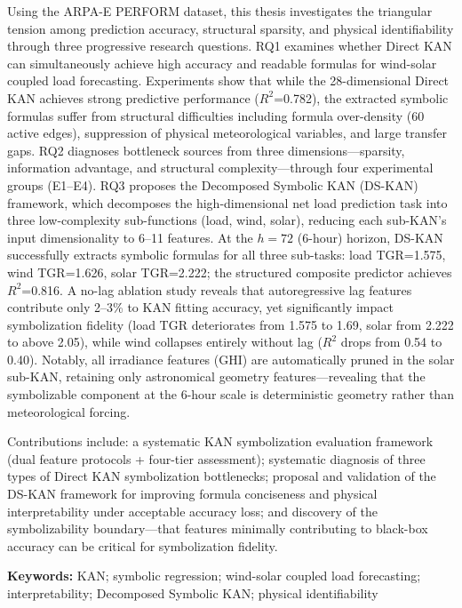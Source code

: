 \documentclass[12pt,a4paper,oneside]{ctexbook}
\begin{document}
Using the ARPA-E PERFORM dataset, this thesis investigates the triangular tension among prediction accuracy, structural sparsity, and physical identifiability through three progressive research questions. RQ1 examines whether Direct KAN can simultaneously achieve high accuracy and readable formulas for wind-solar coupled load forecasting. Experiments show that while the 28-dimensional Direct KAN achieves strong predictive performance ($R^2$=0.782), the extracted symbolic formulas suffer from structural difficulties including formula over-density (60 active edges), suppression of physical meteorological variables, and large transfer gaps. RQ2 diagnoses bottleneck sources from three dimensions---sparsity, information advantage, and structural complexity---through four experimental groups (E1--E4). RQ3 proposes the Decomposed Symbolic KAN (DS-KAN) framework, which decomposes the high-dimensional net load prediction task into three low-complexity sub-functions (load, wind, solar), reducing each sub-KAN's input dimensionality to 6--11 features. At the $h=72$ (6-hour) horizon, DS-KAN successfully extracts symbolic formulas for all three sub-tasks: load TGR=1.575, wind TGR=1.626, solar TGR=2.222; the structured composite predictor achieves $R^2$=0.816. A no-lag ablation study reveals that autoregressive lag features contribute only 2--3\% to KAN fitting accuracy, yet significantly impact symbolization fidelity (load TGR deteriorates from 1.575 to 1.69, solar from 2.222 to above 2.05), while wind collapses entirely without lag ($R^2$ drops from 0.54 to 0.40). Notably, all irradiance features (GHI) are automatically pruned in the solar sub-KAN, retaining only astronomical geometry features---revealing that the symbolizable component at the 6-hour scale is deterministic geometry rather than meteorological forcing.

Contributions include: a systematic KAN symbolization evaluation framework (dual feature protocols + four-tier assessment); systematic diagnosis of three types of Direct KAN symbolization bottlenecks; proposal and validation of the DS-KAN framework for improving formula conciseness and physical interpretability under acceptable accuracy loss; and discovery of the symbolizability boundary---that features minimally contributing to black-box accuracy can be critical for symbolization fidelity.

\vspace{1em}
\noindent\textbf{Keywords:} KAN; symbolic regression; wind-solar coupled load forecasting; interpretability; Decomposed Symbolic KAN; physical identifiability
\end{document}

